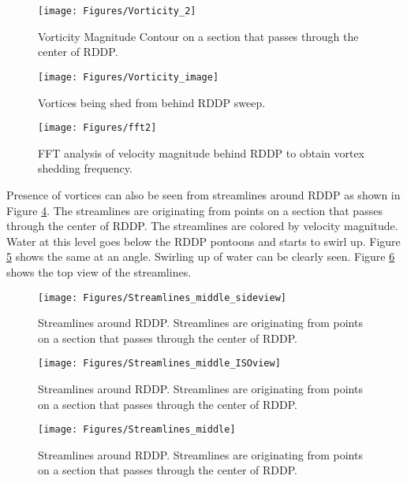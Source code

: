 \begin{figure}
\centering
\texttt{[image: Figures/Vorticity\_2]}
\caption{\label{fig:Vorticity_Mag_middle}Vorticity Magnitude Contour on a section that passes through the center of RDDP.}
\end{figure}

\begin{figure}
\centering
\texttt{[image: Figures/Vorticity\_image]}
\caption{\label{fig:Vorticity_image}Vortices being shed from behind RDDP sweep.}
\end{figure}


\begin{figure}
\centering
\texttt{[image: Figures/fft2]}
\caption{\label{fig:fft}FFT analysis of velocity magnitude behind RDDP to obtain vortex shedding frequency.}
\end{figure}

\noindent Presence of vortices can also be seen from streamlines around RDDP as shown in Figure \ref{fig:Streamlines_middle_sideview}. The streamlines are originating from points on a section that passes through the center of RDDP. The streamlines are colored by velocity magnitude. Water at this level goes below the RDDP pontoons and starts to swirl up. Figure \ref{fig:Streamlines_middle_ISO} shows the same at an angle. Swirling up of water can be clearly seen. Figure \ref{fig:Streamlines_middle} shows the top view of the streamlines. \\

\begin{figure}
\centering
\texttt{[image: Figures/Streamlines\_middle\_sideview]}
\caption{\label{fig:Streamlines_middle_sideview}Streamlines around RDDP. Streamlines are originating from points on a section that passes through the center of RDDP.}
\end{figure}

\begin{figure}
\centering
\texttt{[image: Figures/Streamlines\_middle\_ISOview]}
\caption{\label{fig:Streamlines_middle_ISO}Streamlines around RDDP. Streamlines are originating from points on a section that passes through the center of RDDP.}
\end{figure}

\begin{figure}
\centering
\texttt{[image: Figures/Streamlines\_middle]}
\caption{\label{fig:Streamlines_middle}Streamlines around RDDP. Streamlines are originating from points on a section that passes through the center of RDDP.}
\end{figure}


